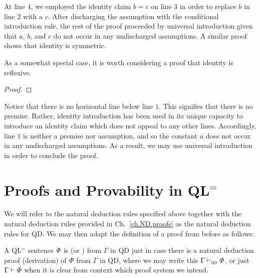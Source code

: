 At line $4$, we employed the identity claim $b = c$ on line $3$ in order to replace $b$ in line $2$ with a $c$.
After discharging the assumption with the conditional introduction rule, the rest of the proof proceeded by universal introduction given that $a$, $b$, and $c$ do not occur in any undischarged assumptions. 
A similar proof shows that identity is symmetric.

As a somewhat special case, it is worth considering a proof that identity is reflexive.

\begin{proof}
    
   
\end{proof}

Notice that there is no horizontal line below line $1$.
This signifies that there is no premise.
Rather, identity introduction has been used in its unique capacity to introduce an identity claim which does not appeal to any other lines.
Accordingly, line $1$ is neither a premise nor assumption, and so the constant $a$ does not occur in any undischarged assumptions.
As a result, we may use universal introduction in order to conclude the proof.




\section{Proofs and Provability in QL$^=$}

We will refer to the natural deduction rules specified above together with the natural deduction rules provided in Ch.~\ref{ch.ND.proofs} as the natural deduction rules for QD.
We may then adapt the definition of a proof from before as follows:


A QL$^=$ sentence $\varPhi$ is  (or ) from $\Gamma$ in QD just in case there is a natural deduction proof (derivation) of $\varPhi$ from $\Gamma$ in QD, where we may write this $\Gamma \vdash_{\textsc{qd}} \varPhi$, or just $\Gamma \vdash \varPhi$ when it is clear from context which proof system we intend. 

